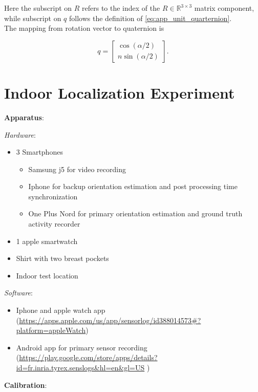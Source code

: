 Here the subscript on $R$ refers to the index of the $R \in \mathbb{R}^{3 \times 3}$ matrix component, while subscript on $q$ follows the definition of \eqref{eq:app_unit_quarternion}. \\
The mapping from rotation vector to quaternion is %

\begin{equation}
	\label{eq:app_rotvec2quat}
	q =\left[\begin{array}{l}{\cos (\alpha / 2)} \\
		{n \sin (\alpha / 2)} \end{array}\right].
\end{equation}

\chapter{Indoor Localization Experiment}
\label{appendix:shs_experiment}
\textbf{Apparatus}:

\emph{Hardware}:

\begin{itemize}
	\item
	3 Smartphones
	
	\begin{itemize}
		\tightlist
		\item
		Samsung j5 for video recording
		\item
		Iphone for backup orientation estimation and post processing time
		synchronization
		\item
		One Plus Nord for primary orientation estimation and ground truth
		activity recorder
	\end{itemize}
	\item
	1 apple smartwatch
	\item
	Shirt with two breast pockets
	\item
	Indoor test location
\end{itemize}

\emph{Software}:

\begin{itemize}
	\tightlist
	\item
	Iphone and apple watch app
	(\url{https://apps.apple.com/us/app/sensorlog/id388014573\#?platform=appleWatch})
	\item
	Android app for primary sensor recording
	(\url{https://play.google.com/store/apps/details?id=fr.inria.tyrex.senslogs\&hl=en\&gl=US}
	)
\end{itemize}

\textbf{Calibration}:

